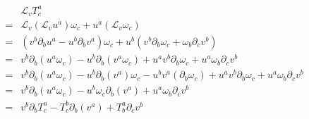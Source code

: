 \documentclass[12pt, letterpaper]{article}
\newcommand*{\1}{\hspace{1pt}}
\begin{document}
    \begin{equation*}
        \begin{split}
            &\mathcal{L}_{v}T^{a}_{c} \\ 
            = & \mathcal{L}_{v}\left(\mathcal{L}_{v}u^{a}\right)\omega_{c} + u^{a}\left(\mathcal{L}_{v}\omega_{c}\right) \\ 
            = & \left(v^{b}\partial_{b}u^{a} - u^{b}\partial_{b}v^{a}\right)\omega_{c} + u^{b}\left(v^{b}\partial_{b}\omega_{c}+\omega_{b}\partial_{c}v^{b}\right) \\
            = & v^{b}\partial_{b}\left(u^{a}\omega_{c}\right) - u^{b}\partial_{b}\left(v^{a}\omega_{c}\right) + u^{a}v^{b}\partial_{b}\omega_{c} + u^{a}\omega_{b}\partial_{c}v^{b} \\ 
            = & v^{b}\partial_{b}\left(u^{a}\omega_{c}\right) - u^{b}\partial_{b}\left(v^{a}\right)\omega_{c} - u^{b}v^{a}\left(\partial_{b}\omega_{c}\right) + u^{a}v^{b}\partial_{b}\omega_{c} + u^{a}\omega_{b}\partial_{c}v^{b} \\ 
            = & v^{b}\partial_{b}\left(u^{a}\omega_{c}\right) - u^{b}\omega_{c}\partial_{b}\left(v^{a}\right) + u^{a}\omega_{b}\partial_{c}v^{b} \\
            = & v^{b}\partial_{b}T^{a}_{c} - T^{b}_{c}\partial_{b}\left(v^{a}\right) + T^{a}_{b}\partial_{c}v^{b} \\
        \end{split}
    \end{equation*}
\end{document}
